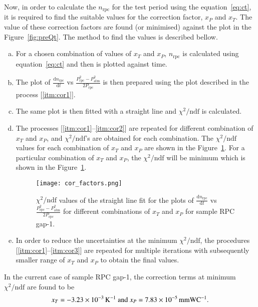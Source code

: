 Now, in order to calculate the $n_{\textrm{rpc}}$ for the test period using the
equation~\ref{eq:ct}, it is required to find the suitable values for the
correction factor, $x_P$ and $x_T$. The value of these correction factors are
found (or minimised) against the plot in the Figure~\ref{fig:preQt}. The method
to find the values is described bellow.
\begin{enumerate}[a.]
\item \label{itm:cor1} For a chosen combination of values of $x_T$ and $x_P$,
  $n_{\textrm{rpc}}$ is calculated using equation~\ref{eq:ct} and then is plotted
  against time.
\item The plot of $\frac{\mathrm{d}n_{\textrm{rpc}}}{\mathrm{d}t}$ vs
  $\frac{P_{\textrm{rpc}}^{2}-P_{\textrm{atm}}^{2}}{2P_{\textrm{rpc}}}$ is then prepared
  using the plot described in the process [\ref{itm:cor1}].
\item \label{itm:cor2} The same plot 
  is then fitted
  with a straight line and $\chi^2/\textrm{ndf}$ is calculated.
\item \label{itm:cor3} The processes [\ref{itm:cor1}--\ref{itm:cor2}] are
  repeated for different combination of $x_T$ and $x_P$, and
  $\chi^2/\textrm{ndf}$'s are obtained for each combination. The
  $\chi^2/\textrm{ndf}$ values for each combination of $x_T$ and $x_P$ are
  shown in the Figure~\ref{fig:xp}. For a particular combination of $x_T$ and
  $x_P$, the $\chi^2/\textrm{ndf}$ will be minimum which is shown in the
  Figure~\ref{fig:xp}.
  \begin{figure}[h]
    \centering
    \texttt{[image: cor\_factors.png]}
    \caption{$\chi^2/\textrm{ndf}$ values of the straight line fit for the
      plots of $\frac{\mathrm{d}n_{\textrm{rpc}}}{\mathrm{d}t}$ vs
      $\frac{P_{\textrm{rpc}}^{2}-P_{\textrm{atm}}^{2}}{2P_{\textrm{rpc}}}$ for different
      combinations of $x_T$ and $x_P$ for sample RPC gap-1.}
    \label{fig:xp}
  \end{figure}
\item In order to reduce the uncertainties at the minimum
  $\chi^2/\textrm{ndf}$, the procedures [\ref{itm:cor1}--\ref{itm:cor3}] are
  repeated for multiple iterations with subsequently smaller range of $x_T$
  and $x_P$ to obtain the final values.
\end{enumerate}

In the current case of sample RPC gap-1, the correction terms at minimum
$\chi^2/\textrm{ndf}$ are found to be
\[x_T=-3.23\times10^{-3}\textrm{\,K}^{-1}\textrm{ and }x_P=7.83\times10^{-5}\textrm{\,mmWC}^{-1}\textrm{.}\]


